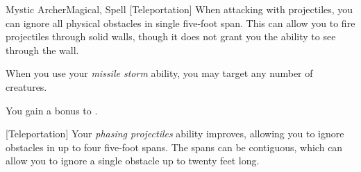 \begin{feat}{Mystic Archer}{Magical, Spell}
        [Teleportation] When attacking with projectiles, you can ignore all physical obstacles in single five-foot span.
        This can allow you to fire projectiles through solid walls, though it does not grant you the ability to see through the wall.

         When you use your \textit{missile storm} ability, you may target any number of creatures.

         You gain a  bonus to .

        [Teleportation] Your \textit{phasing projectiles} ability improves, allowing you to ignore obstacles in up to four five-foot spans.
        The spans can be contiguous, which can allow you to ignore a single obstacle up to twenty feet long.
    \end{feat}

